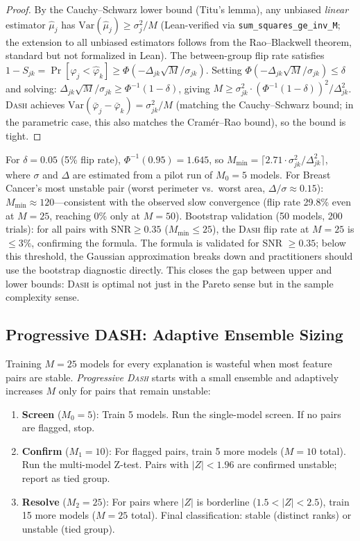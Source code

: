 \documentclass{article}
\newcommand{\Var}{\mathrm{Var}}
\newcommand{\DASH}{\textsc{Dash}}
\begin{document}
\begin{proof}
By the Cauchy--Schwarz lower bound (Titu's lemma), any unbiased \emph{linear} estimator $\hat\mu_j$ has $\Var(\hat\mu_j) \geq \sigma_j^2/M$ (Lean-verified via \texttt{sum\_squares\_ge\_inv\_M}; the extension to all unbiased estimators follows from the Rao--Blackwell theorem, standard but not formalized in Lean). The between-group flip rate satisfies $1 - S_{jk} = \Pr[\hat\varphi_j < \hat\varphi_k] \geq \Phi(-\Delta_{jk}\sqrt{M}/\sigma_{jk})$. Setting $\Phi(-\Delta_{jk}\sqrt{M}/\sigma_{jk}) \leq \delta$ and solving: $\Delta_{jk}\sqrt{M}/\sigma_{jk} \geq \Phi^{-1}(1-\delta)$, giving $M \geq \sigma_{jk}^2 \cdot (\Phi^{-1}(1-\delta))^2/\Delta_{jk}^2$. \DASH{} achieves $\Var(\bar\varphi_j - \bar\varphi_k) = \sigma_{jk}^2/M$ (matching the Cauchy--Schwarz bound; in the parametric case, this also matches the Cram\'er--Rao bound), so the bound is tight.
\end{proof}

For $\delta = 0.05$ (5\% flip rate), $\Phi^{-1}(0.95) = 1.645$, so $M_{\min} = \lceil 2.71 \cdot \sigma_{jk}^2/\Delta_{jk}^2 \rceil$, where $\sigma$ and $\Delta$ are estimated from a pilot run of $M_0 = 5$ models. For Breast Cancer's most unstable pair (worst perimeter vs.\ worst area, $\Delta/\sigma \approx 0.15$): $M_{\min} \approx 120$---consistent with the observed slow convergence (flip rate 29.8\% even at $M = 25$, reaching 0\% only at $M = 50$). Bootstrap validation (50 models, 200 trials): for all pairs with $\text{SNR} \geq 0.35$ ($M_{\min} \leq 25$), the \DASH{} flip rate at $M = 25$ is $\leq 3\%$, confirming the formula. The formula is validated for SNR $\geq 0.35$; below this threshold, the Gaussian approximation breaks down and practitioners should use the bootstrap diagnostic directly. This closes the gap between upper and lower bounds: \DASH{} is optimal not just in the Pareto sense but in the sample complexity sense.

\subsection{Progressive DASH: Adaptive Ensemble Sizing}
\label{sec:progressive-dash}

Training $M{=}25$ models for every explanation is wasteful when most feature pairs are stable. \emph{Progressive \DASH{}} starts with a small ensemble and adaptively increases $M$ only for pairs that remain unstable:

\begin{enumerate}
    \item \textbf{Screen} ($M_0 = 5$): Train 5 models. Run the single-model screen. If no pairs are flagged, stop.
    \item \textbf{Confirm} ($M_1 = 10$): For flagged pairs, train 5 more models ($M = 10$ total). Run the multi-model Z-test. Pairs with $|Z| < 1.96$ are confirmed unstable; report as tied group.
    \item \textbf{Resolve} ($M_2 = 25$): For pairs where $|Z|$ is borderline ($1.5 < |Z| < 2.5$), train 15 more models ($M = 25$ total). Final classification: stable (distinct ranks) or unstable (tied group).
\end{enumerate}
\end{document}
